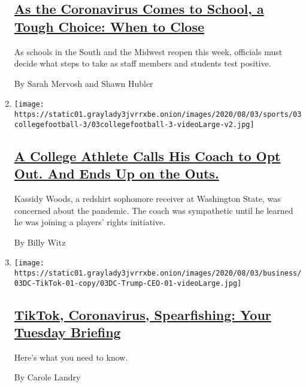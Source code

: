 \begin{enumerate}
  \hypertarget{as-the-coronavirus-comes-to-school-a-tough-choice-when-to-close}{%
  \subsection{\texorpdfstring{\href{/2020/08/03/us/school-closing-coronavirus.html}{As
  the Coronavirus Comes to School, a Tough Choice: When to
  Close}}{As the Coronavirus Comes to School, a Tough Choice: When to Close}}\label{as-the-coronavirus-comes-to-school-a-tough-choice-when-to-close}}

  As schools in the South and the Midwest reopen this week, officials
  must decide what steps to take as staff members and students test
  positive.

  By Sarah Mervosh and Shawn Hubler
\item
  \texttt{[image: https://static01.graylady3jvrrxbe.onion/images/2020/08/03/sports/03collegefootball-3/03collegefootball-3-videoLarge-v2.jpg]}

  \hypertarget{a-college-athlete-calls-his-coach-to-opt-out-and-ends-up-on-the-outs}{%
  \subsection{\texorpdfstring{\href{/2020/08/03/sports/coronavirus-college-athletes-opt-out.html}{A
  College Athlete Calls His Coach to Opt Out. And Ends Up on the
  Outs.}}{A College Athlete Calls His Coach to Opt Out. And Ends Up on the Outs.}}\label{a-college-athlete-calls-his-coach-to-opt-out-and-ends-up-on-the-outs}}

  Kassidy Woods, a redshirt sophomore receiver at Washington State, was
  concerned about the pandemic. The coach was sympathetic until he
  learned he was joining a players' rights initiative.

  By Billy Witz
\item
  \texttt{[image: https://static01.graylady3jvrrxbe.onion/images/2020/08/03/business/03DC-TikTok-01-copy/03DC-Trump-CEO-01-videoLarge.jpg]}

  \hypertarget{tiktok-coronavirus-spearfishing-your-tuesday-briefing}{%
  \subsection{\texorpdfstring{\href{/2020/08/03/briefing/coronavirus-tiktok-afghanistan-australia.html}{TikTok,
  Coronavirus, Spearfishing: Your Tuesday
  Briefing}}{TikTok, Coronavirus, Spearfishing: Your Tuesday Briefing}}\label{tiktok-coronavirus-spearfishing-your-tuesday-briefing}}

  Here's what you need to know.

  By Carole Landry
\end{enumerate}

